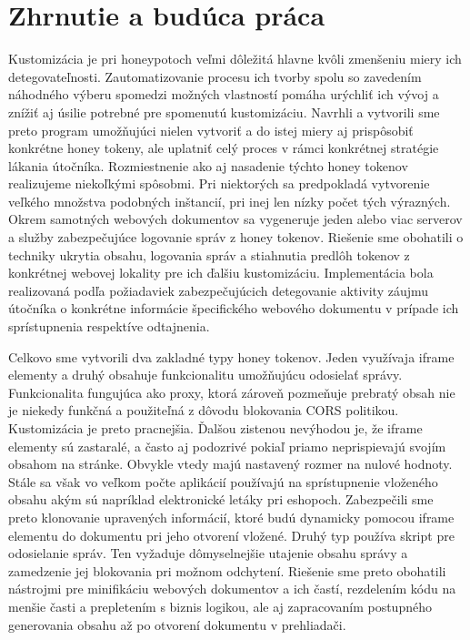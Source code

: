 \documentclass[conference, 11pt,slovak,a4paper,twoside]{IEEEtran}
\begin{document}
\section{Zhrnutie a budúca práca}

Kustomizácia je pri honeypotoch veľmi dôležitá hlavne kvôli zmenšeniu miery ich detegovateľnosti. Zautomatizovanie procesu ich tvorby spolu so zavedením náhodného výberu spomedzi možných vlastností pomáha urýchliť ich vývoj a znížiť aj úsilie potrebné pre spomenutú kustomizáciu. Navrhli a vytvorili sme preto program umožňujúci nielen vytvoriť a do istej miery aj prispôsobiť konkrétne honey tokeny, ale uplatniť celý proces v rámci konkrétnej stratégie lákania útočníka. Rozmiestnenie ako aj nasadenie týchto honey tokenov realizujeme niekoľkými spôsobmi. Pri niektorých sa predpokladá vytvorenie veľkého množstva podobných inštancií, pri inej len nízky počet tých výrazných. Okrem samotných webových dokumentov sa vygeneruje jeden alebo viac serverov a služby zabezpečujúce logovanie správ z honey tokenov. Riešenie sme obohatili o techniky ukrytia obsahu, logovania správ a stiahnutia predlôh tokenov z konkrétnej webovej lokality pre ich ďalšiu kustomizáciu. Implementácia bola realizovaná podľa požiadaviek zabezpečujúcich detegovanie aktivity záujmu útočníka o konkrétne informácie špecifického webového dokumentu v prípade ich sprístupnenia respektíve odtajnenia.

Celkovo sme vytvorili dva zakladné typy honey tokenov. Jeden využívaja iframe elementy a druhý obsahuje funkcionalitu umožňujúcu odosielať správy. Funkcionalita fungujúca ako proxy, ktorá zároveň pozmeňuje prebratý obsah nie je niekedy funkčná a použiteľná z dôvodu blokovania CORS politikou. Kustomizácia je preto pracnejšia. Ďalšou zistenou nevýhodou je, že iframe elementy sú zastaralé, a často aj podozrivé pokiaľ priamo neprispievajú svojím obsahom na stránke. Obvykle vtedy majú nastavený rozmer na nulové hodnoty. Stále sa však vo veľkom počte aplikácií používajú na sprístupnenie vloženého obsahu akým sú napríklad elektronické letáky pri eshopoch. Zabezpečili sme preto klonovanie upravených informácií, ktoré budú dynamicky pomocou iframe elementu do dokumentu pri jeho otvorení vložené. Druhý typ používa skript pre odosielanie správ. Ten vyžaduje dômyselnejšie utajenie obsahu správy a zamedzenie jej blokovania pri možnom odchytení. Riešenie sme preto obohatili nástrojmi pre minifikáciu webových dokumentov a ich častí, rezdelením kódu na menšie časti a prepletením s biznis logikou, ale aj zapracovaním postupného generovania obsahu až po otvorení dokumentu v prehliadači.
\end{document}
